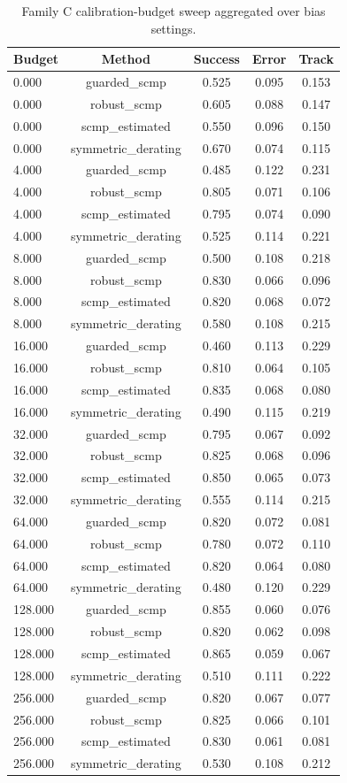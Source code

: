 \begin{table}[t]
\centering
\small
\caption{Family C calibration-budget sweep aggregated over bias settings.}
\label{tab:calibration-budget}
\begin{tabular}{lcccc}
\toprule
Budget & Method & Success & Error & Track \\
\midrule
0.000 & guarded\_scmp & 0.525 & 0.095 & 0.153 \\
0.000 & robust\_scmp & 0.605 & 0.088 & 0.147 \\
0.000 & scmp\_estimated & 0.550 & 0.096 & 0.150 \\
0.000 & symmetric\_derating & 0.670 & 0.074 & 0.115 \\
4.000 & guarded\_scmp & 0.485 & 0.122 & 0.231 \\
4.000 & robust\_scmp & 0.805 & 0.071 & 0.106 \\
4.000 & scmp\_estimated & 0.795 & 0.074 & 0.090 \\
4.000 & symmetric\_derating & 0.525 & 0.114 & 0.221 \\
8.000 & guarded\_scmp & 0.500 & 0.108 & 0.218 \\
8.000 & robust\_scmp & 0.830 & 0.066 & 0.096 \\
8.000 & scmp\_estimated & 0.820 & 0.068 & 0.072 \\
8.000 & symmetric\_derating & 0.580 & 0.108 & 0.215 \\
16.000 & guarded\_scmp & 0.460 & 0.113 & 0.229 \\
16.000 & robust\_scmp & 0.810 & 0.064 & 0.105 \\
16.000 & scmp\_estimated & 0.835 & 0.068 & 0.080 \\
16.000 & symmetric\_derating & 0.490 & 0.115 & 0.219 \\
32.000 & guarded\_scmp & 0.795 & 0.067 & 0.092 \\
32.000 & robust\_scmp & 0.825 & 0.068 & 0.096 \\
32.000 & scmp\_estimated & 0.850 & 0.065 & 0.073 \\
32.000 & symmetric\_derating & 0.555 & 0.114 & 0.215 \\
64.000 & guarded\_scmp & 0.820 & 0.072 & 0.081 \\
64.000 & robust\_scmp & 0.780 & 0.072 & 0.110 \\
64.000 & scmp\_estimated & 0.820 & 0.064 & 0.080 \\
64.000 & symmetric\_derating & 0.480 & 0.120 & 0.229 \\
128.000 & guarded\_scmp & 0.855 & 0.060 & 0.076 \\
128.000 & robust\_scmp & 0.820 & 0.062 & 0.098 \\
128.000 & scmp\_estimated & 0.865 & 0.059 & 0.067 \\
128.000 & symmetric\_derating & 0.510 & 0.111 & 0.222 \\
256.000 & guarded\_scmp & 0.820 & 0.067 & 0.077 \\
256.000 & robust\_scmp & 0.825 & 0.066 & 0.101 \\
256.000 & scmp\_estimated & 0.830 & 0.061 & 0.081 \\
256.000 & symmetric\_derating & 0.530 & 0.108 & 0.212 \\
\bottomrule
\end{tabular}
\end{table}
